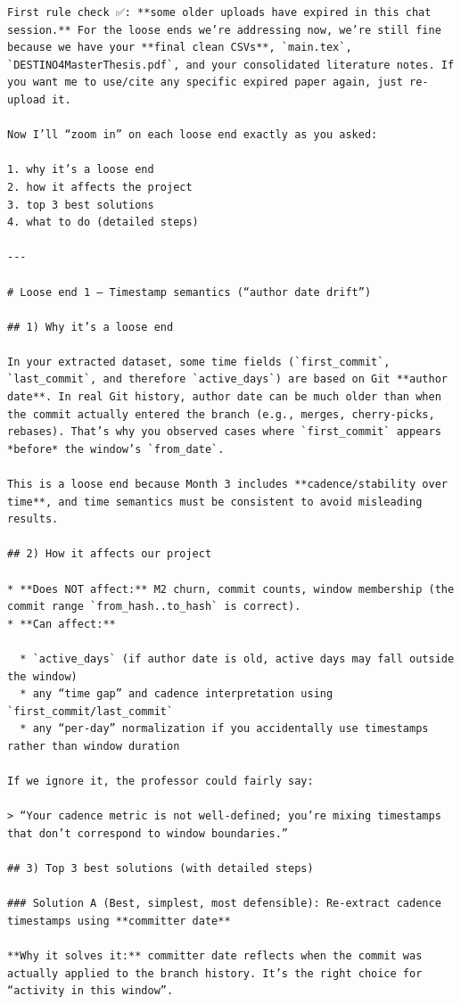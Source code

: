 \documentclass[11pt,a4paper]{article}
\begin{document}
\begin{verbatim}
First rule check ✅: **some older uploads have expired in this chat session.** For the loose ends we’re addressing now, we’re still fine because we have your **final clean CSVs**, `main.tex`, `DESTINO4MasterThesis.pdf`, and your consolidated literature notes. If you want me to use/cite any specific expired paper again, just re-upload it.

Now I’ll “zoom in” on each loose end exactly as you asked:

1. why it’s a loose end
2. how it affects the project
3. top 3 best solutions
4. what to do (detailed steps)

---

# Loose end 1 — Timestamp semantics (“author date drift”)

## 1) Why it’s a loose end

In your extracted dataset, some time fields (`first_commit`, `last_commit`, and therefore `active_days`) are based on Git **author date**. In real Git history, author date can be much older than when the commit actually entered the branch (e.g., merges, cherry-picks, rebases). That’s why you observed cases where `first_commit` appears *before* the window’s `from_date`.

This is a loose end because Month 3 includes **cadence/stability over time**, and time semantics must be consistent to avoid misleading results.

## 2) How it affects our project

* **Does NOT affect:** M2 churn, commit counts, window membership (the commit range `from_hash..to_hash` is correct).
* **Can affect:**

  * `active_days` (if author date is old, active days may fall outside the window)
  * any “time gap” and cadence interpretation using `first_commit/last_commit`
  * any “per-day” normalization if you accidentally use timestamps rather than window duration

If we ignore it, the professor could fairly say:

> “Your cadence metric is not well-defined; you’re mixing timestamps that don’t correspond to window boundaries.”

## 3) Top 3 best solutions (with detailed steps)

### Solution A (Best, simplest, most defensible): Re-extract cadence timestamps using **committer date**

**Why it solves it:** committer date reflects when the commit was actually applied to the branch history. It’s the right choice for “activity in this window”.


\end{verbatim}
\end{document}
